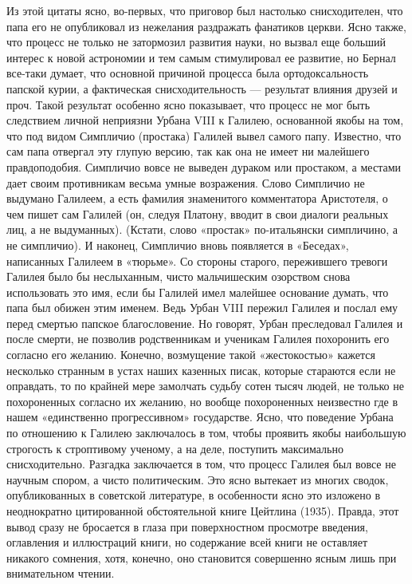 Из этой цитаты ясно, во-первых, что приговор был настолько снисходителен, что
папа его не опубликовал из нежелания раздражать фанатиков церкви. Ясно также,
что процесс не только не затормозил развития науки, но вызвал еще больший
интерес к новой астрономии и тем самым стимулировал ее развитие, но Бернал
все-таки думает, что основной причиной процесса была ортодоксальность папской
курии, а фактическая снисходительность --- результат влияния друзей и проч. Такой
результат особенно ясно показывает, что процесс не мог быть следствием личной
неприязни Урбана VIII к Галилею, основанной якобы на том, что под видом
Симпличио (простака) Галилей вывел самого папу. Известно, что сам папа отвергал
эту глупую версию, так как она не имеет ни малейшего правдоподобия. Симпличио
вовсе не выведен дураком или простаком, а местами дает своим противникам весьма
умные возражения. Слово Симпличио не выдумано Галилеем, а есть фамилия
знаменитого комментатора Аристотеля, о чем пишет сам Галилей (он, следуя
Платону, вводит в свои диалоги реальных лиц, а не выдуманных). (Кстати, слово
«простак» по-итальянски симпличино, а не симпличио). И наконец, Симпличио вновь
появляется в «Беседах», написанных Галилеем в «тюрьме». Со стороны старого,
пережившего тревоги Галилея было бы неслыханным, чисто мальчишеским озорством
снова использовать это имя, если бы Галилей имел малейшее основание думать, что
папа был обижен этим именем. Ведь Урбан VIII пережил Галилея и послал ему перед
смертью папское благословение. Но говорят, Урбан преследовал Галилея и после
смерти, не позволив родственникам и ученикам Галилея похоронить его согласно
его желанию. Конечно, возмущение такой «жестокостью» кажется несколько странным
в устах наших казенных писак, которые стараются если не оправдать, то по
крайней мере замолчать судьбу сотен тысяч людей, не только не похороненных
согласно их желанию, но вообще похороненных неизвестно где в нашем «единственно
прогрессивном» государстве. Ясно, что поведение Урбана по отношению к Галилею
заключалось в том, чтобы проявить якобы наибольшую строгость к строптивому
ученому, а на деле, поступить максимально снисходительно. Разгадка заключается
в том, что процесс Галилея был вовсе не научным спором, а чисто политическим.
Это ясно вытекает из многих сводок, опубликованных в советской литературе, в
особенности ясно это изложено в неоднократно цитированной обстоятельной книге
Цейтлина (1935). Правда, этот вывод сразу не бросается в глаза при
поверхностном просмотре введения, оглавления и иллюстраций книги, но содержание
всей книги не оставляет никакого сомнения, хотя, конечно, оно становится
совершенно ясным лишь при внимательном чтении.

